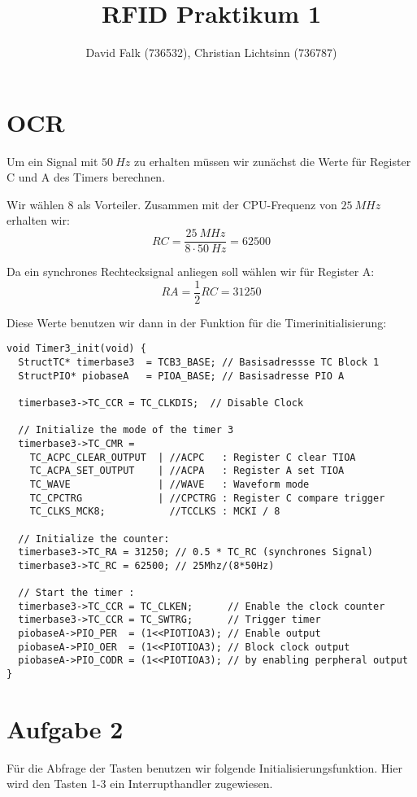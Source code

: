 \documentclass[11pt,a4paper,parskip=half]{scrartcl}
\author{David Falk (736532), Christian Lichtsinn (736787)}
\title{RFID Praktikum 1}
\begin{document}
\maketitle

\section{OCR}
Um ein Signal mit $\SI{50}{Hz}$ zu erhalten müssen wir zunächst die Werte für Register C und A des Timers berechnen.

Wir wählen $8$ als Vorteiler. Zusammen mit der CPU-Frequenz von $\SI{25}{MHz}$ erhalten wir:
$$RC = \frac{\SI{25}{MHz}}{8 \cdot \SI{50}{Hz}} = 62500$$

Da ein synchrones Rechtecksignal anliegen soll wählen wir für Register A:
$$RA = \frac{1}{2} RC = 31250$$

Diese Werte benutzen wir dann in der Funktion für die Timerinitialisierung:

\begin{lstlisting}
void Timer3_init(void) {
  StructTC* timerbase3  = TCB3_BASE; // Basisadressse TC Block 1
  StructPIO* piobaseA   = PIOA_BASE; // Basisadresse PIO A

  timerbase3->TC_CCR = TC_CLKDIS;  // Disable Clock

  // Initialize the mode of the timer 3
  timerbase3->TC_CMR =
    TC_ACPC_CLEAR_OUTPUT  | //ACPC   : Register C clear TIOA
    TC_ACPA_SET_OUTPUT    | //ACPA   : Register A set TIOA
    TC_WAVE               | //WAVE   : Waveform mode
    TC_CPCTRG             | //CPCTRG : Register C compare trigger
    TC_CLKS_MCK8;           //TCCLKS : MCKI / 8

  // Initialize the counter:
  timerbase3->TC_RA = 31250; // 0.5 * TC_RC (synchrones Signal)
  timerbase3->TC_RC = 62500; // 25Mhz/(8*50Hz)

  // Start the timer :
  timerbase3->TC_CCR = TC_CLKEN;      // Enable the clock counter
  timerbase3->TC_CCR = TC_SWTRG;      // Trigger timer
  piobaseA->PIO_PER  = (1<<PIOTIOA3); // Enable output
  piobaseA->PIO_OER  = (1<<PIOTIOA3); // Block clock output
  piobaseA->PIO_CODR = (1<<PIOTIOA3); // by enabling perpheral output
}
\end{lstlisting}

\section*{Aufgabe 2}
Für die Abfrage der Tasten benutzen wir folgende Initialisierungsfunktion. Hier wird den Tasten 1-3 ein Interrupthandler zugewiesen.
\end{document}
